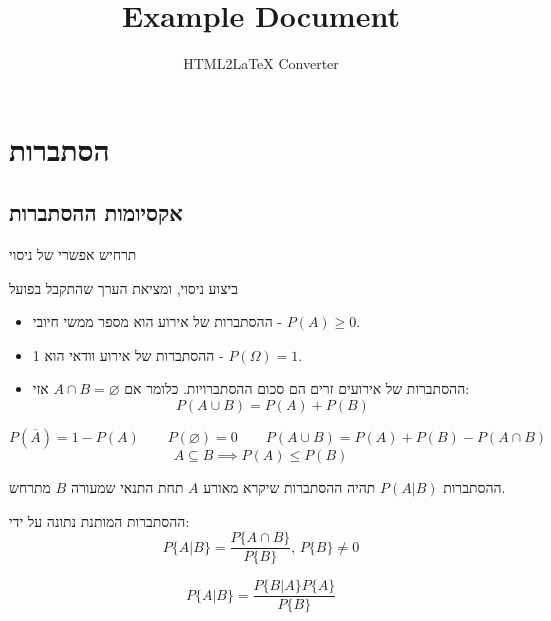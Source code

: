 \documentclass{tstextbook}
\begin{document}
\title{Example Document}
\author{HTML2LaTeX Converter}
\maketitle

\chapter{הסתברות}

\section{אקסיומות ההסתברות}

\begin{definition}[אירוע]
תרחיש אפשרי של ניסוי

\end{definition}
\begin{definition}[מדידה]
ביצוע ניסוי, ומציאת הערך שהתקבל בפועל

\end{definition}
\begin{definition}
  \begin{itemize}
    \item ההסתברות של אירוע הוא מספר ממשי חיובי - \(P(A)\geq 0\).
    \item ההסתברות של אירוע וודאי הוא 1 - \(P\left( \Omega \right)=1\).
    \item ההסתברות של אירועים זרים הם סכום ההסתברויות. כלומר אם \(A\cap B = \varnothing\) אזי:
$$P\left( A\cup B \right)=P(A)+P(B)$$
  \end{itemize}
\end{definition}
\begin{corollary}
$$P\left( \overline{A}  \right)=1-P(A)\qquad P\left( \varnothing  \right)=0\qquad P\left( A\cup B \right)=P(A)+P(B)-P\left( A\cap B \right)$$$$A\subseteq B\implies P(A)\leq P(B)$$

\end{corollary}
\begin{definition}
ההסתברות \(P(A|B)\) תהיה ההסתברות שיקרא מאורע \(A\) תחת התנאי שמעורה \(B\) מתרחש.

\end{definition}
\begin{proposition}
ההסתברות המותנת נתונה על ידי:
$$P\{A|B\}={\frac{P\{A\cap B\}}{P\{B\}}},\,P\{B\}\neq0$$

\end{proposition}
\begin{corollary}
$$P\{A|B\}={\frac{P\{B|A\}P\{A\}}{P\{B\}}}$$

\end{corollary}
\end{document}
